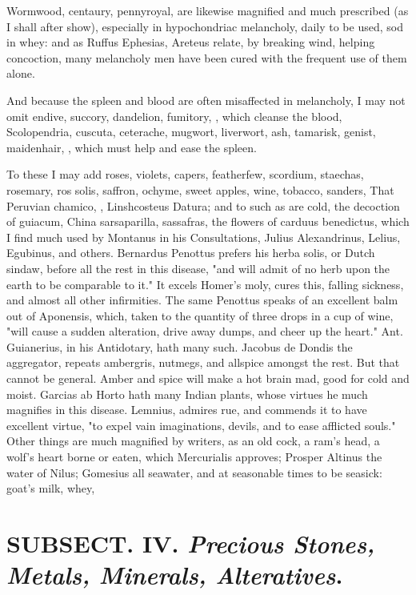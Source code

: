 {Wormwood, centaury, pennyroyal, are likewise magnified and much prescribed (as I shall after show), especially in hypochondriac melancholy, daily to be used, sod in whey: and as Ruffus Ephesias, Areteus relate, by breaking wind, helping concoction, many melancholy men have been cured with the frequent use of them alone.

And because the spleen and blood are often misaffected in melancholy, I may not omit endive, succory, dandelion, fumitory, \etc{}, which cleanse the blood, Scolopendria, cuscuta, ceterache, mugwort, liverwort, ash, tamarisk, genist, maidenhair, \etc{}, which must help and ease the spleen.

To these I may add roses, violets, capers, featherfew, scordium, staechas, rosemary, ros solis, saffron, ochyme, sweet apples, wine, tobacco, sanders, \etc{} That Peruvian chamico, , Linshcosteus Datura; and to such as are cold, the decoction of guiacum, China sarsaparilla, sassafras, the flowers of carduus benedictus, which I find much used by Montanus in his Consultations, Julius Alexandrinus, Lelius, Egubinus, and others. Bernardus Penottus prefers his herba solis, or Dutch sindaw, before all the rest in this disease, "and will admit of no herb upon the earth to be comparable to it." It excels Homer's moly, cures this, falling sickness, and almost all other infirmities. The same Penottus speaks of an excellent balm out of Aponensis, which, taken to the quantity of three drops in a cup of wine, "will cause a sudden alteration, drive away dumps, and cheer up the heart." Ant. Guianerius, in his Antidotary, hath many such. Jacobus de Dondis the aggregator, repeats ambergris, nutmegs, and allspice amongst the rest. But that cannot be general. Amber and spice will make a hot brain mad, good for cold and moist. Garcias ab Horto hath many Indian plants, whose virtues he much magnifies in this disease. Lemnius,  admires rue, and commends it to have excellent virtue, "to expel vain imaginations, devils, and to ease afflicted souls." Other things are much magnified by writers, as an old cock, a ram's head, a wolf's heart borne or eaten, which Mercurialis approves; Prosper Altinus the water of Nilus; Gomesius all seawater, and at seasonable times to be seasick: goat's milk, whey, \etc{}

\section{ SUBSECT. IV. \emph{Precious Stones, Metals, Minerals, Alteratives}.}


}
